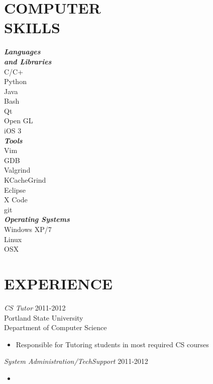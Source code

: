 \documentclass[margin]{res}
\begin{document}
\begin{resume}
\section{COMPUTER \\ SKILLS}	\begin{multicols}{3}
									{\sl \textbf{Languages \\ and Libraries}} \\
									C/C+ \\ Python \\ Java \\ 
							        Bash\\ Qt \\ Open GL \\ iOS 3 \\
									\vfill
									\columnbreak
									{\sl \textbf{Tools}} \\
							 		Vim \\ GDB\\ Valgrind \\ KCacheGrind\\ Eclipse\\ X Code \\ git \\
									\vfill
									\columnbreak
			                		{\sl \textbf{Operating Systems}} \\ Windows XP/7 \\ Linux \\ OSX \\
								\end{multicols}
 
\section{EXPERIENCE} 
				{\sl CS Tutor} \hfill 2011-2012 \\
				Portland State University \\
				Department of Computer Science
				\begin{itemize}	\itemsep -2pt
					\item	Responsible for Tutoring students in most required CS
							courses
				\end{itemize}

				{\sl System Administration/TechSupport} \hfill 2011-2012
				\begin{itemize} \itemsep -2pt
					\item	
				\end{itemize}
				

\end{resume}
\end{document}
